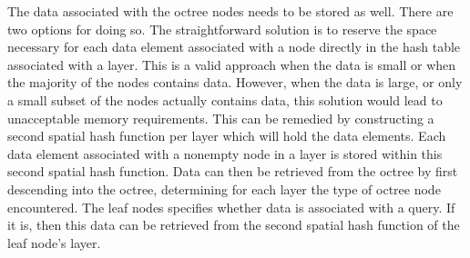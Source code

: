 The data associated with the octree nodes needs to be stored as well. There are two
options for doing so. The straightforward solution is to reserve the space necessary
for each data element associated with a node directly in the hash table associated with
a layer. This is a valid approach when the data is small or when the majority of the nodes
contains data. However, when the data is large, or only a small subset of the nodes
actually contains data, this solution would lead to unacceptable memory requirements.
This can be remedied by constructing a second spatial hash function per layer which
will hold the data elements. Each data element associated with a nonempty node in a layer
is stored within this second spatial hash function. Data can then be retrieved from the octree
by first descending into the octree, determining for each layer the type of octree node
encountered. The leaf nodes specifies whether data is associated with a query. If it is, then
this data can be retrieved from the second spatial hash function of the leaf node's layer.





